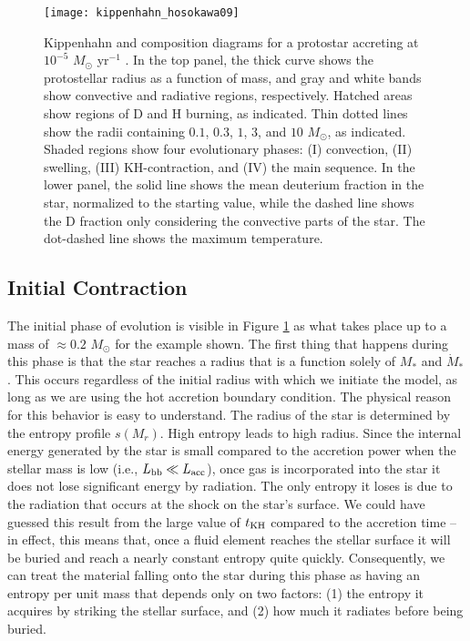 \begin{figure}
\texttt{[image: kippenhahn\_hosokawa09]}
\caption[Kippenhahn diagram for an accretion protostar]{
\label{fig:kippenhahn_hosokawa09}
Kippenhahn and composition diagrams for a protostar accreting at $10^{-5}$ $M_\odot$ yr$^{-1}$ \citep{hosokawa09a}. In the top panel, the thick curve shows the protostellar radius as a function of mass, and gray and white bands show convective and radiative regions, respectively. Hatched areas show regions of D and H burning, as indicated. Thin dotted lines show the radii containing $0.1$, $0.3$, $1$, $3$, and $10$ $M_\odot$, as indicated. Shaded regions show four evolutionary phases: (I) convection, (II) swelling, (III) KH-contraction, and (IV) the main sequence. In the lower panel, the solid line shows the mean deuterium fraction in the star, normalized to the starting value, while the dashed line shows the D fraction only considering the convective parts of the star. The dot-dashed line shows the maximum temperature.
}
\end{figure}

\subsection{Initial Contraction}

The initial phase of evolution is visible in Figure \ref{fig:kippenhahn_hosokawa09} as what takes place up to a mass of $\approx 0.2$ $M_\odot$ for the example shown. The first thing that happens during this phase is that the star reaches a radius that is a function solely of $M_*$ and $\dot{M}_*$. This occurs regardless of the initial radius with which we initiate the model, as long as we are using the hot accretion boundary condition. The physical reason for this behavior is easy to understand. The radius of the star is determined by the entropy profile $s(M_r)$. High entropy leads to high radius. Since the internal energy generated by the star is small compared to the accretion power when the stellar mass is low (i.e., $L_{\rm bb} \ll L_{\rm acc}$), once gas is incorporated into the star it does not lose significant energy by radiation. The only entropy it loses is due to the radiation that occurs at the shock on the star's surface. We could have guessed this result from the large value of $t_{\rm KH}$ compared to the accretion time -- in effect, this means that, once a fluid element reaches the stellar surface it will be buried and reach a nearly constant entropy quite quickly. Consequently, we can treat the material falling onto the star during this phase as having an entropy per unit mass that depends only on two factors: (1) the entropy it acquires by striking the stellar surface, and (2) how much it radiates before being buried.

